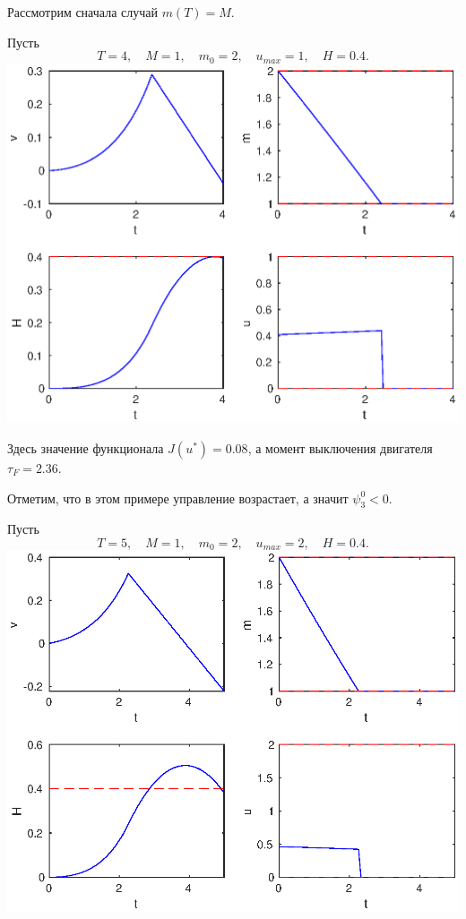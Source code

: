 \documentclass[16pt]{article}
\begin{document}
Рассмотрим сначала случай $m(T) = M$.

Пусть 
$$T = 4, \quad M = 1, \quad m_0 = 2, \quad u_{max} = 1, \quad H = 0.4.$$
\includegraphics[width=160mm]{2F+.eps}

Здесь значение функционала $J(u^*) = 0.08$, а момент выключения двигателя $\tau_F = 2.36$.

Отметим, что в этом примере управление возрастает, а значит $\psi_3^0 < 0$.

\newpage 
Пусть 
$$T = 5, \quad M = 1, \quad m_0 = 2, \quad u_{max} = 2, \quad H = 0.4.$$
\includegraphics[width=160mm]{2F-.eps}
\end{document}
